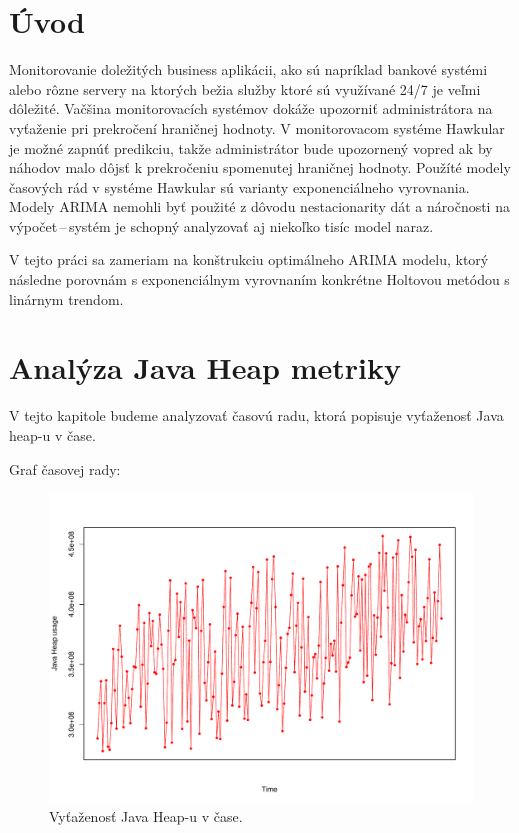 \documentclass[12pt,a4paper,oneside,final]{article}
\theoremstyle{definition}
\theoremstyle{remark}
\numberwithin{equation}{section}
\begin{document}
\VytvorTitulniStranu

\section{Úvod}
Monitorovanie doležitých business aplikácii, ako sú napríklad bankové systémi alebo rôzne
servery na ktorých bežia služby ktoré sú využívané 24/7 je veľmi dôležité. Vačšina
monitorovacích systémov dokáže upozorniť administrátora na vyťaženie pri prekročení
hraničnej hodnoty. V monitorovacom systéme Hawkular je možné zapnúť predikciu, takže
administrátor bude upozornený vopred ak by náhodov malo dôjsť k prekročeniu spomenutej
hraničnej hodnoty. Použíté modely časových rád v systéme Hawkular sú varianty
exponenciálneho vyrovnania. Modely ARIMA nemohli byť použité z dôvodu nestacionarity dát 
a náročnosti na výpočet\,--\,systém je schopný analyzovať aj niekoľko tisíc model naraz. 

V tejto práci sa zameriam na konštrukciu optimálneho ARIMA modelu, ktorý následne porovnám
s exponenciálnym vyrovnaním konkrétne Holtovou metódou s linárnym trendom.

\section{Analýza Java Heap metriky}
V tejto kapitole budeme analyzovať časovú radu, ktorá popisuje vyťaženosť Java heap-u v
čase.

Graf časovej rady:
\begin{figure}[htb] \centering
    \includegraphics[width=.8\textwidth]{images/heap_series.pdf}
    \caption{Vyťaženosť Java Heap-u v čase.}
    \label{obr:heap} %
\end{figure}
\end{document}
